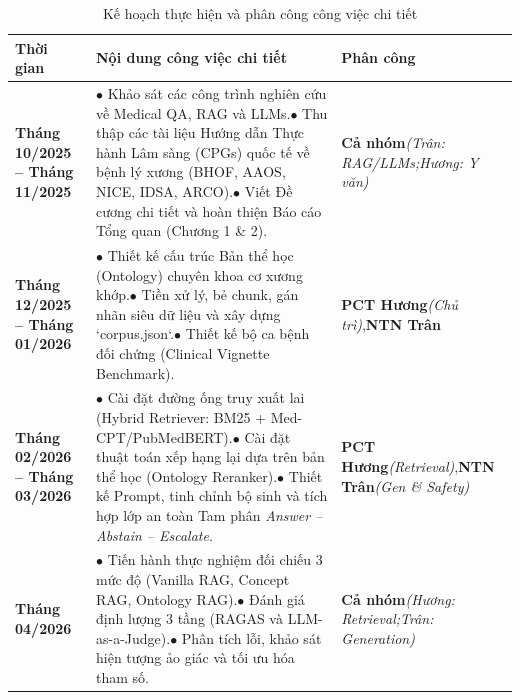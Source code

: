 \documentclass[12pt,a4paper]{article}
\begin{document}
\begin{table}[htbp]
\centering
\fontsize{10pt}{13pt}\selectfont
\caption{Kế hoạch thực hiện và phân công công việc chi tiết}
\label{tab:schedule}
\begin{tabularx}{\textwidth}{|p{2.8cm}|X|p{2.6cm}|}
\hline
\textbf{Thời gian} & \textbf{Nội dung công việc chi tiết} & \textbf{Phân công} \\ \hline
\textbf{Tháng 10/2025 -- Tháng 11/2025} & $\bullet$ Khảo sát các công trình nghiên cứu về Medical QA, RAG và LLMs.\newline $\bullet$ Thu thập các tài liệu Hướng dẫn Thực hành Lâm sàng (CPGs) quốc tế về bệnh lý xương (BHOF, AAOS, NICE, IDSA, ARCO).\newline $\bullet$ Viết Đề cương chi tiết và hoàn thiện Báo cáo Tổng quan (Chương 1 \& 2). & \textbf{Cả nhóm}\newline \textit{(Trân: RAG/LLMs;\newline Hương: Y văn)} \\ \hline
\textbf{Tháng 12/2025 -- Tháng 01/2026} & $\bullet$ Thiết kế cấu trúc Bản thể học (Ontology) chuyên khoa cơ xương khớp.\newline $\bullet$ Tiền xử lý, bẻ chunk, gán nhãn siêu dữ liệu và xây dựng `corpus.json`.\newline $\bullet$ Thiết kế bộ ca bệnh đối chứng (Clinical Vignette Benchmark). & \textbf{PCT Hương}\newline \textit{(Chủ trì)},\newline \textbf{NTN Trân} \\ \hline
\textbf{Tháng 02/2026 -- Tháng 03/2026} & $\bullet$ Cài đặt đường ống truy xuất lai (Hybrid Retriever: BM25 + Med-CPT/PubMedBERT).\newline $\bullet$ Cài đặt thuật toán xếp hạng lại dựa trên bản thể học (Ontology Reranker).\newline $\bullet$ Thiết kế Prompt, tinh chỉnh bộ sinh và tích hợp lớp an toàn Tam phân \textit{Answer -- Abstain -- Escalate}. & \textbf{PCT Hương}\newline \textit{(Retrieval)},\newline \textbf{NTN Trân}\newline \textit{(Gen \& Safety)} \\ \hline
\textbf{Tháng 04/2026} & $\bullet$ Tiến hành thực nghiệm đối chiếu 3 mức độ (Vanilla RAG, Concept RAG, Ontology RAG).\newline $\bullet$ Đánh giá định lượng 3 tầng (RAGAS và LLM-as-a-Judge).\newline $\bullet$ Phân tích lỗi, khảo sát hiện tượng ảo giác và tối ưu hóa tham số. & \textbf{Cả nhóm}\newline \textit{(Hương: Retrieval;\newline Trân: Generation)} \\ \hline

\end{tabularx}
\end{table}
\end{document}
